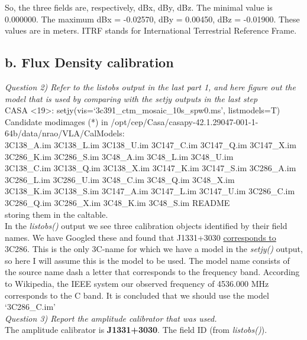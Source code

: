 \documentclass[12pt, a4paper]{article}
\begin{document}
So, the three fields are, respectively, dBx, dBy, dBz. The minimal value is 0.000000. The maximum dBx = -0.02570, dBy = 0.00450, dBz = -0.01900. These values are in meters. ITRF stands for International Terrestrial Reference Frame.

\subsection{b. Flux Density calibration}
\noindent \textit{Question 2) Refer to the listobs output in the last part 1, and here figure out the model that is used by comparing with the setjy outputs in the last step} \\ 
CASA <19>: setjy(vis=`3c391\_ctm\_mosaic\_10s\_spw0.ms', listmodels=T) \\

{\tiny \noindent Candidate modimages (*) in /opt/cep/Casa/casapy-42.1.29047-001-1-64b/data/nrao/VLA/CalModels: \\
3C138\_A.im  3C138\_L.im	3C138\_U.im  3C147\_C.im	3C147\_Q.im  3C147\_X.im	3C286\_K.im  3C286\_S.im	3C48\_A.im  3C48\_L.im  3C48\_U.im \\
3C138\_C.im  3C138\_Q.im	3C138\_X.im  3C147\_K.im	3C147\_S.im  3C286\_A.im	3C286\_L.im  3C286\_U.im	3C48\_C.im  3C48\_Q.im  3C48\_X.im \\
3C138\_K.im  3C138\_S.im	3C147\_A.im  3C147\_L.im	3C147\_U.im  3C286\_C.im	3C286\_Q.im  3C286\_X.im	3C48\_K.im  3C48\_S.im  README \\
storing them in the caltable.}  \\

In the \emph{listobs()} output we see three calibration objects identified by their field names. We have Googled these and found that J1331+3030 \href{http://casaguides.nrao.edu/index.php?title=EVLA_Continuum_Tutorial_3C391}{corresponds to} 3C286. This is the only 3C-name for which we have a model in the \emph{setjy()} output, so here I will assume this is the model to be used. The model name consists of the source name dash a letter that corresponds to the frequency band. According to Wikipedia, the IEEE system our observed frequency of 4536.000 MHz corresponds to the C band. It is concluded that we should use the model `3C286\_C.im' \\

\noindent \textit{Question 3) Report the amplitude calibrator that was used.} \\
The amplitude calibrator is \textbf{J1331+3030}. The field ID (from \emph{listobs()}). \\
\end{document}
